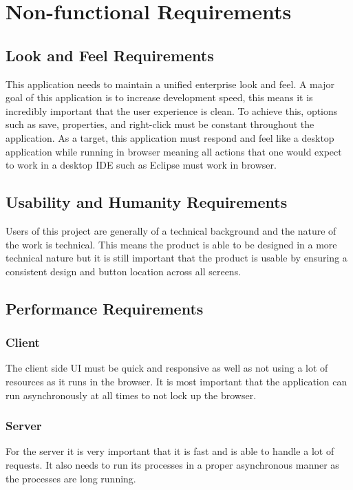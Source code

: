 \documentclass[12pt, titlepage]{article}
\begin{document}
\section{Non-functional Requirements}

  \subsection{Look and Feel Requirements}
	This application needs to maintain a unified enterprise look and feel. A
	major goal of this application is to increase development speed, this means
	it is incredibly important that the user experience is clean. To achieve
	this, options such as save, properties, and right-click must be constant
	throughout the application. As a target, this application must respond and
	feel like a desktop application while running in browser meaning all actions
	that one would expect to work in a desktop IDE such as Eclipse must work in
	browser.

  \subsection{Usability and Humanity Requirements}
		Users of this project are generally of a technical background and the
		nature of the work  is technical. This means the product is able to be
		designed in a more technical nature but it is still important that the product
		is usable by ensuring a consistent design and button location across all
		screens.

  \subsection{Performance Requirements}
    \subsubsection{Client}
		The client side UI must be quick and responsive as well as not using a lot
		of resources as it runs in the browser. It is most important that the
		application can run asynchronously at all times to not lock up the browser.

    \subsubsection{Server}
		For the server it is very important that it is fast and is able to handle a
		lot of requests. It also needs to run its processes in a proper
		asynchronous manner as the processes are long running.
\end{document}

